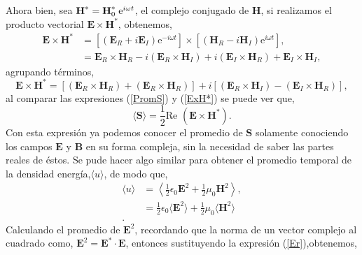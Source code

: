 \documentclass[11pt,fleqn]{book} %
\begin{document}
Ahora bien, sea $\textbf{H}^{\ast}=\textbf{H}_0^\ast\hspace{1mm}\text{e}^{i\omega t}$, el complejo conjugado de $\textbf{H}$, si realizamos
el producto vectorial $\textbf{E}\times\textbf{H}^{\ast}$, obtenemos,
\begin{equation*}
\begin{split}
\textbf{E}\times\textbf{H}^{\ast}&=[(\textbf{E}_R+i\textbf{E}_I)\text{e}^{-i\omega t}] \times[(\textbf{H}_R-i\textbf{H}_I)\text{e}^{i\omega t}],\\
&=\textbf{E}_R\times \textbf{H}_R-i(\textbf{E}_R\times \textbf{H}_I)+i(\textbf{E}_I\times \textbf{H}_R)+\textbf{E}_I\times \textbf{H}_I,
\end{split}
\end{equation*}
agrupando t\'erminos,
\begin{equation} \label{ExH*}
 \textbf{E}\times\textbf{H}^{\ast}=[(\textbf{E}_R\times \textbf{H}_R)+(\textbf{E}_R\times \textbf{H}_R)]+i[(\textbf{E}_R\times \textbf{H}_I)-(\textbf{E}_I\times \textbf{H}_R)],
\end{equation}
al comparar las expresiones (\ref{PromS}) y (\ref{ExH*}) se puede ver que,
\begin{equation}
 \langle \textbf{S}\rangle=\frac12 \text{Re }( \textbf{E}\times\textbf{H}^{\ast}).
\end{equation}
Con esta expresi\'on ya podemos conocer el promedio de $\textbf{S}$ solamente conociendo los campos $\textbf{E}$ y $\textbf{B}$ en su forma compleja,
sin la necesidad de saber las partes reales de \'estos. Se pude hacer algo similar para obtener el promedio temporal de la densidad energ\'ia,$\langle u \rangle$, de modo que,
\begin{equation*}
\begin{split}
\langle u \rangle&=\left\langle \frac{1}{2}\epsilon_0\textbf{E}^2 + \frac{1}{2}\mu_0\textbf{H}^2\right\rangle,\\
&=\frac{1}{2}\epsilon_0\langle \textbf{E}^2 \rangle+\frac{1}{2}\mu_0\langle \textbf{H}^2 \rangle\\.
\end{split}
\end{equation*}
Calculando el promedio de $\textbf{E}^2$, recordando que la norma de un vector complejo al cuadrado como, $\textbf{E}^2=\textbf{E}^{\ast}\cdot\textbf{E}$, entonces sustituyendo
la expresi\'on (\ref{Er}),obtenemos,
\end{document}
